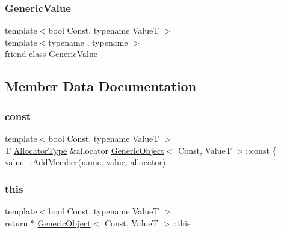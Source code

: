 \subsubsection{\texorpdfstring{Generic\+Value}{GenericValue}}
{\footnotesize\ttfamily template$<$bool Const, typename ValueT $>$ \\
template$<$typename , typename $>$ \\
friend class \hyperlink{classGenericValue}{Generic\+Value}\hspace{0.3cm}{\ttfamily [friend]}}



\subsection{Member Data Documentation}
\mbox{\label{classGenericObject_af70c9646b5e422306c33e98b3d8783a7}} 
\subsubsection{\texorpdfstring{const}{const}}
{\footnotesize\ttfamily template$<$bool Const, typename ValueT $>$ \\
T \hyperlink{classGenericObject_a00c8cee952d5ebadc5e1c309aa489ad9}{Allocator\+Type} \&allocator \hyperlink{classGenericObject}{Generic\+Object}$<$ Const, ValueT $>$\+::const \{ value\+\_\+.\+Add\+Member(\hyperlink{imgui__impl__opengl3__loader_8h_a5c4947d4516dd7cfa3505ce3a648a4ef}{name}, \hyperlink{imgui__impl__opengl3__loader_8h_a32aff7c6c4cd253fdf6563677afab5ce}{value}, allocator)}

\mbox{\label{classGenericObject_a719a0e5501da825e6f86ce12b46446cb}} 
\subsubsection{\texorpdfstring{this}{this}}
{\footnotesize\ttfamily template$<$bool Const, typename ValueT $>$ \\
return $\ast$ \hyperlink{classGenericObject}{Generic\+Object}$<$ Const, ValueT $>$\+::this}

\mbox{\label{classGenericObject_a131538fbbacbc0a3a5ad15dbea66394f}} 
